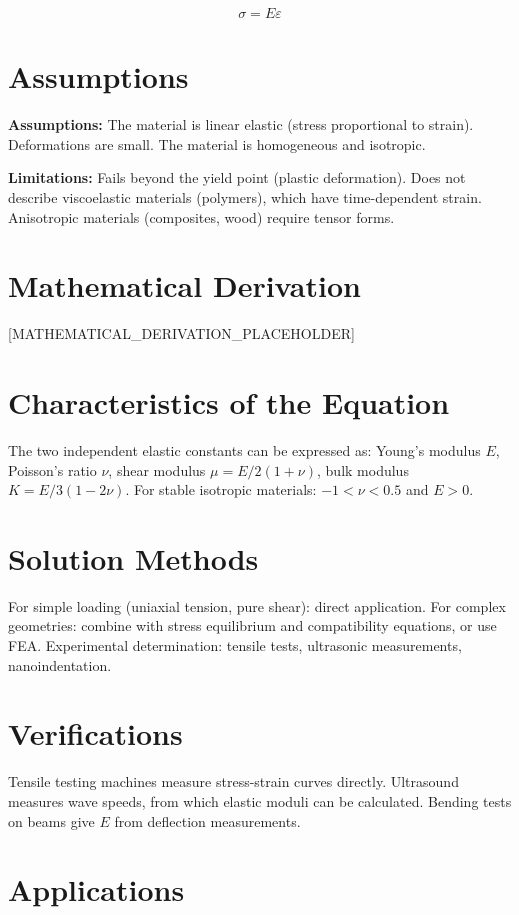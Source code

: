 \documentclass[11pt,openright]{book}
\begin{document}
\[
\sigma = E\varepsilon
\]


\item
\section*{Assumptions}

\textbf{Assumptions:} The material is linear elastic (stress proportional to strain). Deformations are small. The material is homogeneous and isotropic.


\textbf{Limitations:} Fails beyond the yield point (plastic deformation). Does not describe viscoelastic materials (polymers), which have time-dependent strain. Anisotropic materials (composites, wood) require tensor forms.


\section*{Mathematical Derivation}

[MATHEMATICAL_DERIVATION_PLACEHOLDER]

\section*{Characteristics of the Equation}

The two independent elastic constants can be expressed as: Young's modulus $E$, Poisson's ratio $\nu$, shear modulus $\mu = E/2(1+\nu)$, bulk modulus $K = E/3(1-2\nu)$. For stable isotropic materials: $-1 < \nu < 0.5$ and $E > 0$.
\section*{Solution Methods}

For simple loading (uniaxial tension, pure shear): direct application. For complex geometries: combine with stress equilibrium and compatibility equations, or use FEA. Experimental determination: tensile tests, ultrasonic measurements, nanoindentation.
\section*{Verifications}

Tensile testing machines measure stress-strain curves directly. Ultrasound measures wave speeds, from which elastic moduli can be calculated. Bending tests on beams give $E$ from deflection measurements.
\section*{Applications}
\end{document}
